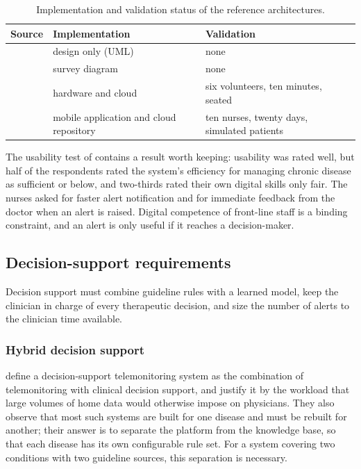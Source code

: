 \begin{table}[htbp]
\centering\footnotesize
\caption{Implementation and validation status of the reference architectures.}\label{tab:arch-status}
\begin{tabularx}{\textwidth}{@{}>{\raggedright\arraybackslash}p{3.0cm} >{\raggedright\arraybackslash}X >{\raggedright\arraybackslash}X@{}}
\toprule
\textbf{Source} & \textbf{Implementation} & \textbf{Validation} \\
\midrule
\textcite{yazdani2018} & design only (UML) & none \\
\textcite{liu2025review} & survey diagram & none \\
\textcite{efendi2025} & hardware and cloud & six volunteers, ten minutes, seated \\
\textcite{mucchi2021} & mobile application and cloud repository & ten nurses, twenty days, simulated patients \\
\bottomrule
\end{tabularx}
\end{table}

The usability test of \textcite{mucchi2021} contains a result worth keeping: usability was rated well, but half of the respondents rated the system's efficiency for managing chronic disease as sufficient or below, and two-thirds rated their own digital skills only fair. The nurses asked for faster alert notification and for immediate feedback from the doctor when an alert is raised. Digital competence of front-line staff is a binding constraint, and an alert is only useful if it reaches a decision-maker.


\subsection{Decision-support requirements}\label{sec:cdss}

Decision support must combine guideline rules with a learned model, keep the clinician in charge of every therapeutic decision, and size the number of alerts to the clinician time available.

\subsubsection{Hybrid decision support}\label{sec:dsts-def}\label{sec:rule-model}\label{sec:ts-diagnostics}

\Textcite{yazdani2018} define a decision-support telemonitoring system as the combination of telemonitoring with clinical decision support, and justify it by the workload that large volumes of home data would otherwise impose on physicians. They also observe that most such systems are built for one disease and must be rebuilt for another; their answer is to separate the platform from the knowledge base, so that each disease has its own configurable rule set. For a system covering two conditions with two guideline sources, this separation is necessary.

